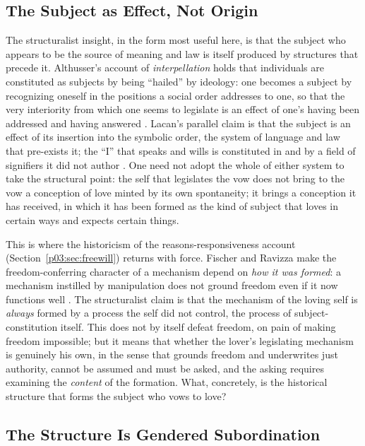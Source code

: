 \subsection{The Subject as Effect, Not Origin}

The structuralist insight, in the form most useful here, is that the subject who appears to be the source of meaning and law is itself produced by structures that precede it. Althusser's account of \emph{interpellation} holds that individuals are constituted as subjects by being ``hailed'' by ideology: one becomes a subject by recognizing oneself in the positions a social order addresses to one, so that the very interiority from which one seems to legislate is an effect of one's having been addressed and having answered \parencite{althusser1971ideology}. Lacan's parallel claim is that the subject is an effect of its insertion into the symbolic order, the system of language and law that pre-exists it; the ``I'' that speaks and wills is constituted in and by a field of signifiers it did not author \parencite{lacan2006ecrits}. One need not adopt the whole of either system to take the structural point: the self that legislates the vow does not bring to the vow a conception of love minted by its own spontaneity; it brings a conception it has received, in which it has been formed as the kind of subject that loves in certain ways and expects certain things.

This is where the historicism of the reasons-responsiveness account (Section~\ref{p03:sec:freewill}) returns with force. Fischer and Ravizza make the freedom-conferring character of a mechanism depend on \emph{how it was formed}: a mechanism instilled by manipulation does not ground freedom even if it now functions well \parencite{fischer1998responsibility}. The structuralist claim is that the mechanism of the loving self is \emph{always} formed by a process the self did not control, the process of subject-constitution itself. This does not by itself defeat freedom, on pain of making freedom impossible; but it means that whether the lover's legislating mechanism is genuinely his own, in the sense that grounds freedom and underwrites just authority, cannot be assumed and must be asked, and the asking requires examining the \emph{content} of the formation. What, concretely, is the historical structure that forms the subject who vows to love?

\subsection{The Structure Is Gendered Subordination}

